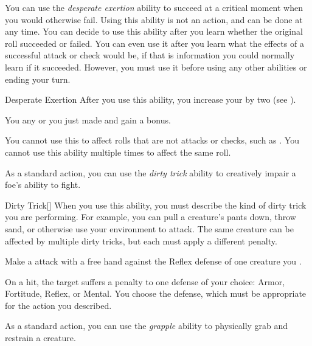         \label{Desperate Exertion} You can use the \textit{desperate exertion} ability to succeed at a critical moment when you would otherwise fail.
        Using this ability is not an action, and can be done at any time.
        You can decide to use this ability after you learn whether the original roll succeeded or failed.
        You can even use it after you learn what the effects of a successful attack or check would be, if that is information you could normally learn if it succeeded.
        However, you must use it before using any other abilities or ending your turn.

        \begin{activeability}{Desperate Exertion}
            \rankline
            After you use this ability, you increase your  by two (see ).

            You  any  or  you just made and gain a  bonus.

            You cannot use this to affect rolls that are not attacks or checks, such as .
            You cannot use this ability multiple times to affect the same roll.
        \end{activeability}

        \label{Dirty Trick} As a standard action, you can use the \textit{dirty trick} ability to creatively impair a foe's ability to fight.

        \begin{activeability}{Dirty Trick}[]
            \rankline
            When you use this ability, you must describe the kind of dirty trick you are performing.
            For example, you can pull a creature's pants down, throw sand, or otherwise use your environment to attack.
            The same creature can be affected by multiple dirty tricks, but each must apply a different penalty.

            Make a attack with a free hand against the Reflex defense of one creature you .

            On a hit, the target  suffers a  penalty to one defense of your choice: Armor, Fortitude, Reflex, or Mental.
            You choose the defense, which must be appropriate for the action you described.
        \end{activeability}

        \label{Grapple} As a standard action, you can use the \textit{grapple} ability to physically grab and restrain a creature.

